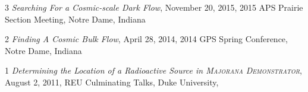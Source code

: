 \documentclass[margin]{res}
\begin{document}
\begin{resume}
\hangindent=15pt {\footnotesize \textcolor{light-gray}{3}} {\sl Searching For a Cosmic-scale Dark Flow}, November 20, 2015,
2015 APS Prairie Section Meeting, Notre Dame, Indiana
\vspace{-12pt}

\hangindent=15pt {\footnotesize \textcolor{light-gray}{2}} {\sl Finding A Cosmic Bulk Flow}, April 28, 2014, 2014 GPS Spring Conference, Notre Dame, Indiana
\vspace{-12pt}

\hangindent=15pt {\footnotesize \textcolor{light-gray}{1}} {\sl Determining the Location of a Radioactive Source in \textsc{Majorana Demonstrator}}, August 2, 2011, REU Culminating Talks, Duke University, 

\begin{comment}
{\sl Searching For a Cosmic-scale Dark Flow} \hfill {\bf November 20, 2015}\\
2015 APS Prairie Section Meeting, Notre Dame

{\sl Finding A Cosmic Bulk Flow} \hfill {\bf April 28, 2014}\\
2014 GPS Spring Conference, Notre Dame 

{\sl Determining the Location of a Radioactive Source in \textsc{Majorana}} \hfill {\bf August 2, 2011} \\
{\sl\textsc{Demonstrator}} \\
REU Culminating Talks,
Duke University %
\end{comment}








\end{resume}
\end{document}
